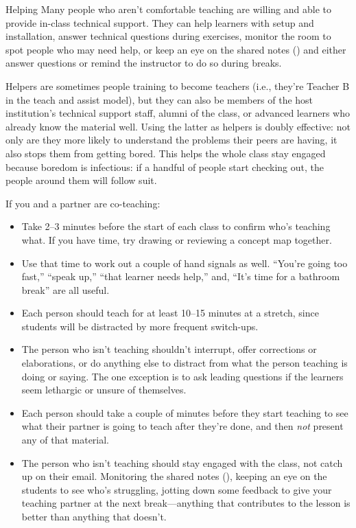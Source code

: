 \begin{aside}{Helping}
  Many people who aren't comfortable teaching
  are willing and able to provide in-class technical support.
  They can help learners with setup and installation,
  answer technical questions during exercises,
  monitor the room to spot people who may need help,
  or keep an eye on the shared notes ()
  and either answer questions
  or remind the instructor to do so during breaks.

  Helpers are sometimes people training to become teachers
  (i.e., they're Teacher B in the teach and assist model),
  but they can also be members of the host institution's technical support staff,
  alumni of the class,
  or advanced learners who already know the material well.
  Using the latter as helpers is doubly effective:
  not only are they more likely to understand the problems their peers are having,
  it also stops them from getting bored.
  This helps the whole class stay engaged because boredom is infectious:
  if a handful of people start checking out,
  the people around them will follow suit.
\end{aside}

If you and a partner are co-teaching:

\begin{itemize}

\item
  Take 2--3 minutes before the start of each class
  to confirm who's teaching what.
  If you have time,
  try drawing or reviewing a concept map together.

\item
  Use that time to work out a couple of hand signals as well.
  ``You're going too fast,''
  ``speak up,''
  ``that learner needs help,''
  and, ``It's time for a bathroom break'' are all useful.

\item
  Each person should teach for at least 10--15 minutes at a stretch,
  since students will be distracted by more frequent switch-ups.

\item
  The person who isn't teaching shouldn't interrupt,
  offer corrections or elaborations,
  or do anything else to distract from what the person teaching is doing or saying.
  The one exception is to ask leading questions
  if the learners seem lethargic or unsure of themselves.

\item
  Each person should take a couple of minutes before they start teaching
  to see what their partner is going to teach after they're done,
  and then \emph{not} present any of that material.

\item
  The person who isn't teaching should stay engaged with the class,
  not catch up on their email.
  Monitoring the shared notes (),
  keeping an eye on the students to see who's struggling,
  jotting down some feedback to give your teaching partner at the next break---anything
  that contributes to the lesson is better than anything that doesn't.

\end{itemize}


